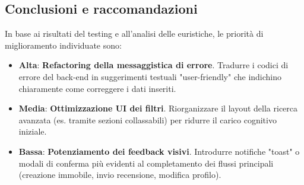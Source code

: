 \documentclass[a4paper,11pt]{report}
\begin{document}
\pagebreak

\subsection{Conclusioni e raccomandazioni}

In base ai risultati del testing e all'analisi delle euristiche, le priorità di miglioramento individuate sono:

\begin{itemize}[nosep]
  \item \textbf{Alta}: \textbf{Refactoring della messaggistica di errore}. Tradurre i codici di errore del back-end in suggerimenti testuali "user-friendly" che indichino chiaramente come correggere i dati inseriti.
  \item \textbf{Media}: \textbf{Ottimizzazione UI dei filtri}. Riorganizzare il layout della ricerca avanzata (es. tramite sezioni collassabili) per ridurre il carico cognitivo iniziale.
  \item \textbf{Bassa}: \textbf{Potenziamento dei feedback visivi}. Introdurre notifiche "toast" o modali di conferma più evidenti al completamento dei flussi principali (creazione immobile, invio recensione, modifica profilo).
\end{itemize}
\end{document}
